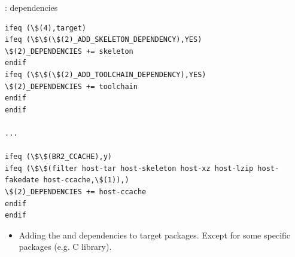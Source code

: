 \begin{frame}[fragile]{: dependencies}

\begin{block}{}
\begin{verbatim}
ifeq (\$(4),target)
ifeq (\$\$(\$(2)_ADD_SKELETON_DEPENDENCY),YES)
\$(2)_DEPENDENCIES += skeleton
endif
ifeq (\$\$(\$(2)_ADD_TOOLCHAIN_DEPENDENCY),YES)
\$(2)_DEPENDENCIES += toolchain
endif
endif

...

ifeq (\$\$(BR2_CCACHE),y)
ifeq (\$\$(filter host-tar host-skeleton host-xz host-lzip host-fakedate host-ccache,\$(1)),)
\$(2)_DEPENDENCIES += host-ccache
endif
endif
\end{verbatim}
\end{block}

\begin{itemize}
\item Adding the  and  dependencies to
  target packages. Except for some specific packages (e.g. C library).
\end{itemize}
\end{frame}

